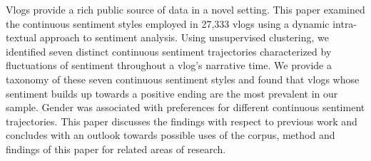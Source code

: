 Vlogs provide a rich public source of data in a novel setting. This paper examined the continuous sentiment styles employed in 27,333 vlogs using a dynamic intra-textual approach to sentiment analysis. Using unsupervised clustering, we identified seven distinct continuous sentiment trajectories characterized by fluctuations of sentiment throughout a vlog's narrative time. We provide a taxonomy of these seven continuous sentiment styles and found that vlogs whose sentiment builds up towards a positive ending are the most prevalent in our sample. Gender was associated with preferences for different continuous sentiment trajectories. This paper discusses the findings with respect to previous work and concludes with an outlook towards possible uses of the corpus, method and findings of this paper for related areas of research.
